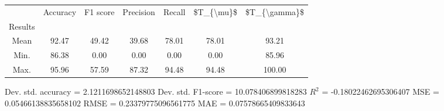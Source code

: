 \begin{tabular}{|c|c|c|c|c|c|c|}
\toprule
{} &  Accuracy &  F1 score &  Precision &  Recall &  \$T\_\{\textbackslash mu\}\$ &  \$T\_\{\textbackslash gamma\}\$ \\
Results &           &           &            &         &            &               \\
\hline
Mean    &     92.47 &     49.42 &      39.68 &   78.01 &      78.01 &         93.21 \\
Min.    &     86.38 &      0.00 &       0.00 &    0.00 &       0.00 &         85.96 \\
Max.    &     95.96 &     57.59 &      87.32 &   94.48 &      94.48 &        100.00 \\
\bottomrule
\end{tabular}

 Dev. std. accuracy = 2.1211698652148803
 Dev. std. F1-score = 10.078406899818283
 $R^2$ = -0.18022462695306407
 MSE = 0.05466138835658102
 RMSE = 0.23379775096561775
 MAE = 0.07578665409833643